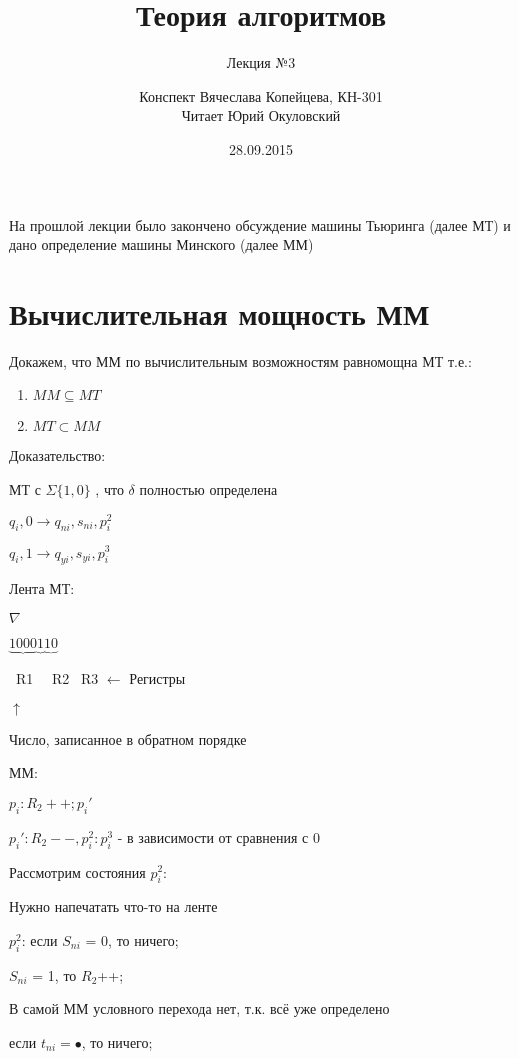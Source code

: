 \documentclass{scrartcl}
\begin{document}
\title{Теория алгоритмов}
\subtitle{Лекция №3}
\author{Конспект Вячеслава Копейцева, КН-301\\Читает Юрий Окуловский}
\date{28.09.2015}
\maketitle
На прошлой лекции было закончено обсуждение машины Тьюринга (далее МТ) и дано определение машины Минского (далее ММ)
\section{Вычислительная мощность ММ}

Докажем, что ММ по вычислительным возможностям равномощна МТ т.е.:
\begin{enumerate}
\item $ MM \subseteq MT $
\item$ MT \subset MM $
\end{enumerate}
Доказательство:
\begin{enumerate}
 МТ с $ \Sigma \{1, 0\} $
, что $ \delta$ полностью определена
\end{enumerate}

$ q_i, 0 \to q_{ni}, s_{ni}, p_i^2$

$ q_i, 1 \to q_{yi}, s_{yi}, p_i^3$

Лента МТ:

\hspace*{18mm}$\nabla$

$\underbrace{1000} \underbrace{1} \underbrace{10}$

\ R1 \ \ R2 \ R3 $\leftarrow$ Регистры

\hspace*{18mm}$\uparrow$

Число, записанное в обратном порядке

ММ:

$p_i : R_2++ ; p_i'$

$p_i' : R_2--, p_i^2 : p_i^3$ - в зависимости от сравнения с 0

Рассмотрим состояния $ p_i^2$:

Нужно напечатать что-то на ленте

$ p_i^2$: если $S_{ni}$ = 0, то ничего;

\hspace*{15mm}$S_{ni}$ = 1, то $R_2$++;

В самой ММ условного перехода нет, т.к. всё уже определено

если $t_{ni} = \bullet$, то ничего;
\end{document}

